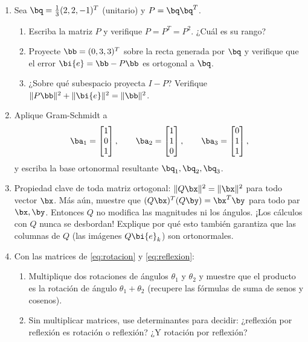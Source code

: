 \begin{enumerate}[leftmargin=*,label=\textbf{\thechapter.\arabic*}]
\item\label{ej:proy-recta}  Sea $\bq=\frac13(2,2,-1)^T$ (unitario) y
$P=\bq\bq^T$.
\begin{enumerate}[label=(\alph*)]
\item Escriba la matriz $P$ y verifique $P=P^T=P^2$. ¿Cuál es su rango?
\item Proyecte $\bb=(0,3,3)^T$ sobre la recta generada por $\bq$ y
verifique que el error $\bi{e}=\bb-P\bb$ es ortogonal a $\bq$.
\item ¿Sobre qué subespacio proyecta $I-P$? Verifique
$\|P\bb\|^2+\|\bi{e}\|^2=\|\bb\|^2$.
\end{enumerate}

\item {} Aplique Gram-Schmidt a
\[
\ba_1=\begin{bmatrix}1\\0\\1\end{bmatrix},\qquad
\ba_2=\begin{bmatrix}1\\1\\0\end{bmatrix},\qquad
\ba_3=\begin{bmatrix}0\\1\\1\end{bmatrix},
\]
y escriba la base ortonormal resultante $\bq_1,\bq_2,\bq_3$.

\item {} Propiedad clave de toda matriz ortogonal:
$\|Q\bx\|^2=\|\bx\|^2$ para todo vector $\bx$. Más aún, muestre que
$(Q\bx)^T(Q\by)=\bx^T\by$ para todo par $\bx,\by$. Entonces $Q$
no modifica las magnitudes ni los ángulos. ¡Los cálculos con $Q$ nunca se
desbordan! Explique por qué esto también garantiza que las columnas de $Q$
(las imágenes $Q\bi{e}_k$) son ortonormales.

\item {} Con las matrices de \eqref{eq:rotacion} y
\eqref{eq:reflexion}:
\begin{enumerate}[label=(\alph*)]
\item Multiplique dos rotaciones de ángulos $\theta_1$ y $\theta_2$ y
muestre que el producto es la rotación de ángulo $\theta_1+\theta_2$
(recupere las fórmulas de suma de senos y cosenos).
\item Sin multiplicar matrices, use determinantes para decidir: ¿reflexión
por reflexión es rotación o reflexión? ¿Y rotación por reflexión?
\end{enumerate}


\end{enumerate}
